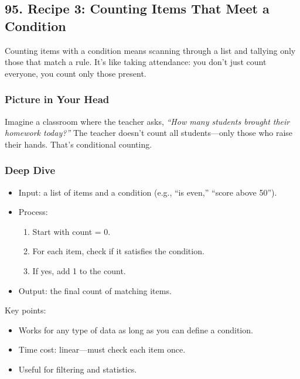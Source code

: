 \documentclass[
  letterpaper,
  DIV=11,
  numbers=noendperiod]{scrreprt}
\providecommand{\tightlist}{%
  \setlength{\itemsep}{0pt}\setlength{\parskip}{0pt}}
\begin{document}
\subsection{95. Recipe 3: Counting Items That Meet a
Condition}\label{recipe-3-counting-items-that-meet-a-condition}

Counting items with a condition means scanning through a list and
tallying only those that match a rule. It's like taking attendance: you
don't just count everyone, you count only those present.

\subsubsection{Picture in Your Head}\label{picture-in-your-head-95}

Imagine a classroom where the teacher asks, \emph{``How many students
brought their homework today?''} The teacher doesn't count all
students---only those who raise their hands. That's conditional
counting.

\subsubsection{Deep Dive}\label{deep-dive-65}

\begin{itemize}
\item
  Input: a list of items and a condition (e.g., ``is even,'' ``score
  above 50'').
\item
  Process:

  \begin{enumerate}
  \def\labelenumi{\arabic{enumi}.}
  \tightlist
  \item
    Start with count = 0.
  \item
    For each item, check if it satisfies the condition.
  \item
    If yes, add 1 to the count.
  \end{enumerate}
\item
  Output: the final count of matching items.
\end{itemize}

Key points:

\begin{itemize}
\tightlist
\item
  Works for any type of data as long as you can define a condition.
\item
  Time cost: linear---must check each item once.
\item
  Useful for filtering and statistics.
\end{itemize}
\end{document}
